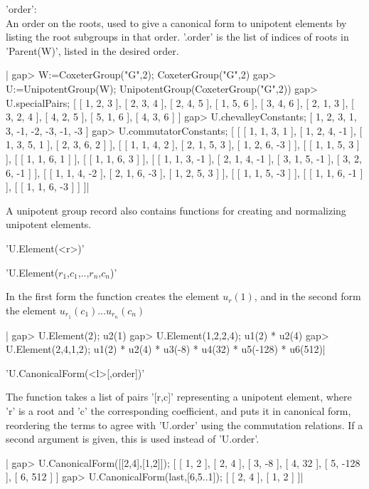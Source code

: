 'order':\\  An order on the roots, used to give a canonical form to unipotent
     elements  by listing the root subgroups in that order. '.order' is the
     list of indices of roots in 'Parent(W)', listed in the desired order.

|    gap> W:=CoxeterGroup("G",2);     
    CoxeterGroup("G",2)
    gap> U:=UnipotentGroup(W);
    UnipotentGroup(CoxeterGroup("G",2))
    gap> U.specialPairs;
    [ [ 1, 2, 3 ], [ 2, 3, 4 ], [ 2, 4, 5 ], [ 1, 5, 6 ], [ 3, 4, 6 ], 
      [ 2, 1, 3 ], [ 3, 2, 4 ], [ 4, 2, 5 ], [ 5, 1, 6 ], [ 4, 3, 6 ] ]
    gap> U.chevalleyConstants;
    [ 1, 2, 3, 1, 3, -1, -2, -3, -1, -3 ]
    gap> U.commutatorConstants;
    [ [ [ 1, 1, 3, 1 ], [ 1, 2, 4, -1 ], [ 1, 3, 5, 1 ], [ 2, 3, 6, 2 ] ], 
      [ [ 1, 1, 4, 2 ], [ 2, 1, 5, 3 ], [ 1, 2, 6, -3 ] ], 
      [ [ 1, 1, 5, 3 ] ], [ [ 1, 1, 6, 1 ] ], [ [ 1, 1, 6, 3 ] ], 
      [ [ 1, 1, 3, -1 ], [ 2, 1, 4, -1 ], [ 3, 1, 5, -1 ], 
          [ 3, 2, 6, -1 ] ], 
      [ [ 1, 1, 4, -2 ], [ 2, 1, 6, -3 ], [ 1, 2, 5, 3 ] ], 
      [ [ 1, 1, 5, -3 ] ], [ [ 1, 1, 6, -1 ] ], [ [ 1, 1, 6, -3 ] ] ]|
   
A unipotent group record also contains functions for creating and normalizing
unipotent elements.

'U.Element(<r>)'

'U.Element($r_1$,$c_1$,..,$r_n$,$c_n$)'

In the first form the function creates the element $u_r(1)$, and in the second
form the element $u_{r_1}(c_1)\ldots u_{r_n}(c_n)$

|    gap> U.Element(2);
    u2(1)
    gap> U.Element(1,2,2,4);
    u1(2) * u2(4)
    gap> U.Element(2,4,1,2);
    u1(2) * u2(4) * u3(-8) * u4(32) * u5(-128) * u6(512)|

'U.CanonicalForm(<l>[,order])'

The  function  takes  a  list  of  pairs  '[r,c]'  representing a unipotent
element,  where 'r'  is a  root and  'c' the corresponding coefficient, and
puts  it in  canonical form,  reordering the  terms to  agree with 'U.order'
using  the commutation  relations. If  a second  argument is given, this is
used instead of 'U.order'.

|    gap> U.CanonicalForm([[2,4],[1,2]]);
    [ [ 1, 2 ], [ 2, 4 ], [ 3, -8 ], [ 4, 32 ], [ 5, -128 ], [ 6, 512 ] ]
    gap> U.CanonicalForm(last,[6,5..1]);
    [ [ 2, 4 ], [ 1, 2 ] ]|


